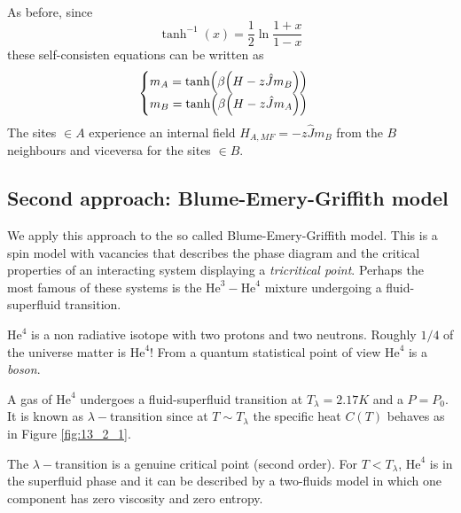 \documentclass[../main/main.tex]{subfiles}
\begin{document}
\begin{example}
\begin{itemize}
\begin{subequations}
\begin{align}
\end{align}
\end{subequations}
As before, since
\begin{equation}
  \tanh^{-1} (x) = \frac{1}{2} \ln{\frac{1+x}{1-x}}
\end{equation}
these self-consisten equations can be written as
\begin{equation}
  \begin{cases}
   m_A = \tanh ( \beta \qty(H - z \hat{J} m_B ) )\\
   m_B = \tanh ( \beta \qty(H - z \hat{J} m_A ) )
  \end{cases}
\end{equation}
The sites \( \in A \) experience an internal field \( H_{A,MF} = - z \hat{J} m_B \) from the \( B \) neighbours and viceversa for the sites \( \in B \).
\end{itemize}
\end{example}

\subsection{Second approach: Blume-Emery-Griffith model}
We apply this approach to the so called Blume-Emery-Griffith model.
This is a spin model with vacancies that describes the phase diagram and the critical properties of an interacting system displaying a \emph{tricritical point}. Perhaps the most famous of these systems is the \( \text{He}^3-\text{He}^4 \) mixture undergoing a fluid-superfluid transition.

\begin{remark}
\( \text{He}^4 \)  is a non radiative isotope with two protons and two neutrons. Roughly \( 1/4 \) of the universe matter is \( \text{He}^4 \)!
From a quantum statistical point of view \( \text{He}^4 \) is a \emph{boson}.

\end{remark}
 A gas of \( \text{He}^4 \) undergoes a fluid-superfluid transition at \( T_ \lambda =2.17 K \) and a \( P=P_0 \). It is known as \( \lambda - \)transition since at \( T \sim T_ \lambda  \)  the specific heat \( C(T) \) behaves as in Figure \ref{fig:13_2_1}.

\begin{remark}
The \( \lambda - \)transition is a genuine critical point (second order). For \( T < T_{\lambda } \), \( \text{He}^4 \)  is in the superfluid phase and it can be described by a two-fluids model in which one component has zero viscosity and zero entropy.
\end{remark}
\end{document}

